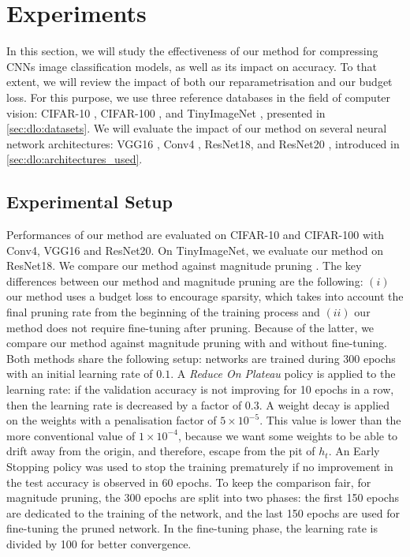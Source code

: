 
\section{Experiments}\label{sec:chap1:experiments}

In this section, we will study the effectiveness of our method for compressing
\aclp{CNN} image classification models, as well as its impact on accuracy. To
that extent, we will review the impact of both our reparametrisation and our
budget loss. For this purpose, we use three reference databases in the field of
computer vision: CIFAR-10 \cite{CIFARdataset}, CIFAR-100 \cite{CIFARdataset},
and TinyImageNet \cite{TinyImageNet}, presented in \cref{sec:dlo:datasets}. We
will evaluate the impact of our method on several neural network architectures:
VGG16 \cite{DBLP:journals/corr/SimonyanZ14a}, Conv4
\cite{DBLP:conf/iclr/FrankleC19}, ResNet18, and ResNet20
\cite{DBLP:conf/cvpr/HeZRS16}, introduced in
\cref{sec:dlo:architectures_used}.\\


\subsection{Experimental Setup}\label{sec:chap1:experimental_setup}

Performances of our method are evaluated on CIFAR-10 and CIFAR-100 with Conv4,
VGG16 and ResNet20. On TinyImageNet, we evaluate our method on ResNet18. We
compare our method against magnitude pruning \cite{DBLP:conf/nips/HanPTD15}. The
key differences between our method and magnitude pruning are the following:
$(i)$ our method uses a budget loss to encourage sparsity, which takes into
account the final pruning rate from the beginning of the training process and
$(ii)$ our method does not require fine-tuning after pruning. Because of the
latter, we compare our method against magnitude pruning with and without
fine-tuning. Both methods share the following setup: networks are trained during
300 epochs with an initial learning rate of $0.1$. A \emph{Reduce On Plateau}
policy is applied to the learning rate: if the validation accuracy is not
improving for 10 epochs in a row, then the learning rate is decreased by a
factor of $0.3$. A weight decay is applied on the weights with a penalisation
factor of $5\times10^{−5}$. This value is lower than the more conventional value
of $1\times10^{-4}$, because we want some weights to be able to drift away from
the origin, and therefore, escape from the pit of $h_t$. An Early Stopping
policy was used to stop the training prematurely if no improvement in the test
accuracy is observed in 60 epochs. To keep the comparison fair, for magnitude
pruning, the 300 epochs are split into two phases: the first 150 epochs are
dedicated to the training of the network, and the last 150 epochs are used for
fine-tuning the pruned network. In the fine-tuning phase, the learning rate is
divided by 100 for better convergence. \\


